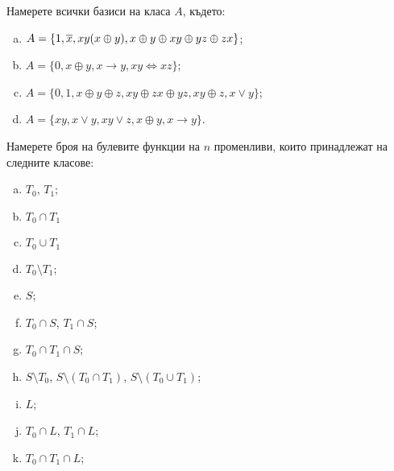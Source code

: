 \begin{problem}
  Намерете всички базиси на класа $A$, където:
  \begin{enumerate}[a)]
  \item 
    $A = \{1, \overline{x}, xy(x\oplus y), x \oplus y \oplus xy \oplus yz \oplus zx\}$;
  \item
    $A = \{0, x\oplus y, x \to y, xy \iff xz\}$;
  \item
    $A = \{0,1,x\oplus y \oplus z, xy \oplus zx \oplus yz, xy \oplus z, x \vee y\}$;
  \item
    $A = \{xy, x\vee y, xy\vee z, x\oplus y, x \to y\}$.
  \end{enumerate}
\end{problem}

\begin{problem}
  Намерете броя на булевите функции на $n$ променливи, които принадлежат на следните класове:
  \begin{enumerate}[a)]
  \item
    $T_0$, $T_1$;
  \item
    $T_0 \cap T_1$
  \item
    $T_0 \cup T_1$
  \item
    $T_0 \setminus T_1$;
  \item
    $S$;
  \item
    $T_0 \cap S$, $T_1 \cap S$;
  \item
    $T_0 \cap T_1 \cap S$;
  \item
    $S \setminus T_0$, $S \setminus (T_0 \cap T_1)$, $S \setminus (T_0 \cup T_1)$;
  \item
    $L$;
  \item
    $T_0 \cap L$, $T_1 \cap L$;
  \item
    $T_0 \cap T_1 \cap L$;
  \end{enumerate}
\end{problem}



